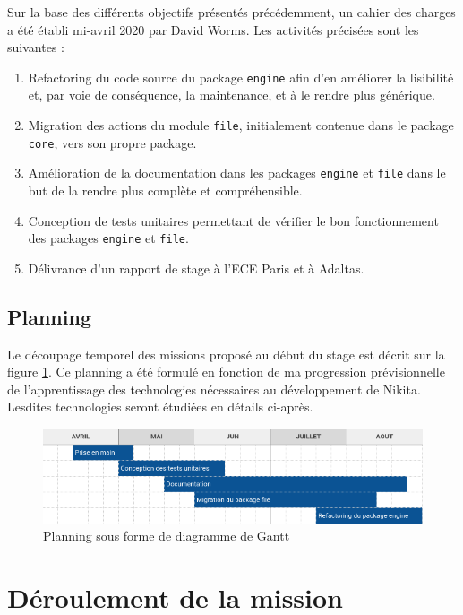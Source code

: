 \documentclass[12pt, french]{report}
\begin{document}
Sur la base des différents objectifs présentés précédemment, un cahier des charges a été établi mi-avril 2020 par David Worms. Les activités précisées sont les suivantes : 

\begin{enumerate}
  \item Refactoring du code source du package \texttt{engine} afin d'en améliorer la lisibilité et, par voie de conséquence, la maintenance, et à le rendre plus générique.
  \item Migration des actions du module \texttt{file}, initialement contenue dans le package \texttt{core}, vers son propre package.
  \item Amélioration de la documentation dans les packages \texttt{engine} et \texttt{file} dans le but de la rendre plus complète et compréhensible.
  \item Conception de tests unitaires permettant de vérifier le bon fonctionnement des packages \texttt{engine} et \texttt{file}.
  \item Délivrance d'un rapport de stage à l'ECE Paris et à Adaltas.
\end{enumerate}

\section{Planning}

Le découpage temporel des missions proposé au début du stage est décrit sur la figure \ref{fig:planning}. Ce planning a été formulé en fonction de ma progression prévisionnelle de l'apprentissage des technologies nécessaires au développement de Nikita. Lesdites technologies seront étudiées en détails ci-après.

\begin{figure}[h]
\includegraphics[scale=0.6]{assets/img/planning.png}
\centering
\caption{Planning sous forme de diagramme de Gantt}
\label{fig:planning}
\end{figure}

\chapter{Déroulement de la mission}
\end{document}

